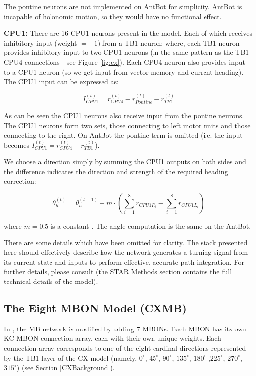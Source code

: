 \documentclass[a4paper,11pt,twoside,openright]{article}
\begin{document}
The pontine neurons are not implemented on AntBot for simplicity. AntBot is
incapable of holonomic motion, so they would have no functional effect.
\newline
\par

\textbf{CPU1:}
There are 16 CPU1 neurons present in the model. Each of which
receives inhibitory input (weight $= -1$) from a TB1 neuron; where, each
TB1 neuron provides inhibitory input to two CPU1 neurons (in the same pattern
as the TB1-CPU4 connections - see Figure \ref{fig:cx}). Each CPU4 neuron also
provides input to a CPU1 neuron (so we get input from vector memory and current
heading). The CPU1 input can be expressed as:

\begin{equation}
  I_{CPU1}^{(t)} = r_{CPU4}^{(t)} - r_{Pontine}^{(t)} - r_{TB1}^{(t)}
\end{equation}

As can be seen the CPU1 neurons also receive input from the pontine neurons.
The CPU1 neurons form two sets, those connecting to left motor units and those
connecting to the right. On AntBot the pontine term is omitted
(i.e. the input becomes
$I_{CPU1}^{(t)} = r_{CPU4}^{(t)} - r_{TB1}^{(t)}$).
\newline
\par

We choose a direction simply by summing the CPU1 outputs on both sides
and the difference indicates the direction and strength of the
required heading correction:

\begin{equation}
  \theta_h^{(t)} = \theta_h^{(t - 1)} +
  m \cdot (\sum_{i = 1}^{8} r_{CPU1R_{i}} - \sum_{i = 1}^{8} r_{CPU1L_{i}})
\end{equation}

where $m = 0.5$ is a constant \cite{Stone2017}. The angle computation is the
same on the AntBot.
\newline
\par

There are some details which have been omitted for clarity. The stack
presented here should effectively describe how the network generates a
turning signal from its current state and inputs to perform effective,
accurate path integration. For further details, please consult
\cite{Stone2017} (the STAR Methods section contains the full technical
details of the model).

\subsection{ The Eight MBON Model (CXMB) } \label{CXMBBackground}
In \cite{Zhang2017}, the MB network is modified by adding 7 MBONs. Each MBON has
its own KC-MBON connection array, each with their own unique weights. Each
connection array corresponds to one of the eight cardinal directions represented
by the TB1 layer of the CX model (namely, $0^{\circ}$, $45^{\circ}$,
$90^{\circ}$, $135^{\circ}$, $180^{\circ}$ ,$225^{\circ}$, $270^{\circ}$,
$315^{\circ}$) (see Section \ref{CXBackground}).
\newline
\par
\end{document}
